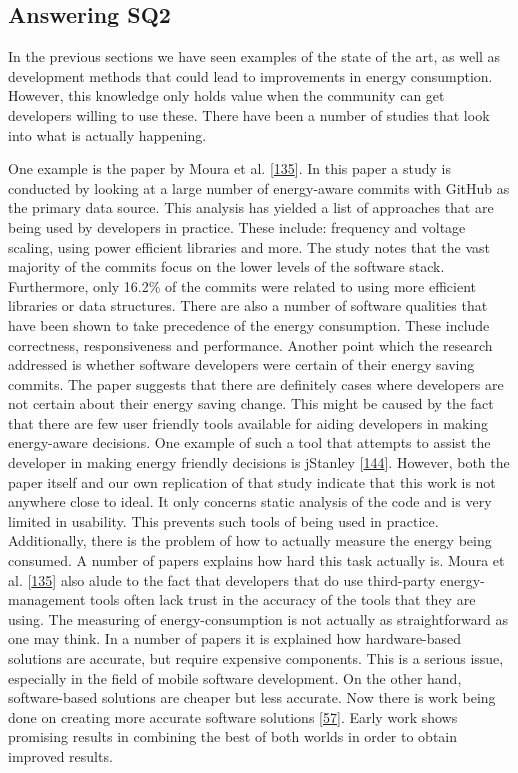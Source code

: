 \documentclass[]{book}
\begin{document}
\subsection{Answering SQ2}\label{answering-sq2}

In the previous sections we have seen examples of the state of the art,
as well as development methods that could lead to improvements in energy
consumption. However, this knowledge only holds value when the community
can get developers willing to use these. There have been a number of
studies that look into what is actually happening.

One example is the paper by Moura et al.
{[}\protect\hyperlink{ref-MPEC2015}{135}{]}. In this paper a study is
conducted by looking at a large number of energy-aware commits with
GitHub as the primary data source. This analysis has yielded a list of
approaches that are being used by developers in practice. These include:
frequency and voltage scaling, using power efficient libraries and more.
The study notes that the vast majority of the commits focus on the lower
levels of the software stack. Furthermore, only 16.2\% of the commits
were related to using more efficient libraries or data structures. There
are also a number of software qualities that have been shown to take
precedence of the energy consumption. These include correctness,
responsiveness and performance. Another point which the research
addressed is whether software developers were certain of their energy
saving commits. The paper suggests that there are definitely cases where
developers are not certain about their energy saving change. This might
be caused by the fact that there are few user friendly tools available
for aiding developers in making energy-aware decisions. One example of
such a tool that attempts to assist the developer in making energy
friendly decisions is jStanley
{[}\protect\hyperlink{ref-PSCS2018}{144}{]}. However, both the paper
itself and our own replication of that study indicate that this work is
not anywhere close to ideal. It only concerns static analysis of the
code and is very limited in usability. This prevents such tools of being
used in practice. Additionally, there is the problem of how to actually
measure the energy being consumed. A number of papers explains how hard
this task actually is. Moura et al.
{[}\protect\hyperlink{ref-MPEC2015}{135}{]} also alude to the fact that
developers that do use third-party energy-management tools often lack
trust in the accuracy of the tools that they are using. The measuring of
energy-consumption is not actually as straightforward as one may think.
In a number of papers it is explained how hardware-based solutions are
accurate, but require expensive components. This is a serious issue,
especially in the field of mobile software development. On the other
hand, software-based solutions are cheaper but less accurate. Now there
is work being done on creating more accurate software solutions
{[}\protect\hyperlink{ref-NPPPZL2017}{57}{]}. Early work shows promising
results in combining the best of both worlds in order to obtain improved
results.
\end{document}
